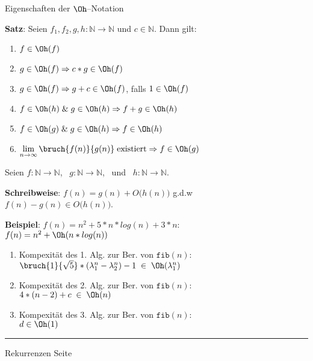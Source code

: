 
\begin{slide}{}
\normalsize

\begin{center}
Eigenschaften der $\Oh$--Notation
\end{center}
\vspace*{0.5cm}

\footnotesize
\textbf{Satz}: Seien $f_1,f_2,g,h: \mathbb{N} \rightarrow \mathbb{N}$ und $c \in \mathbb{N}$. Dann gilt:
\begin{enumerate}
\item $f \in \Oh(f)$
\item $g \in \Oh(f) \Rightarrow c * g \in \Oh(f)$
\item $g \in \Oh(f) \Rightarrow g + c \in \Oh(f)$, falls $1 \in \Oh(f)$
\item $f \in \Oh(h) \;\&\; g \in \Oh(h) \Rightarrow f + g \in \Oh(h)$
\item $f \in \Oh(g) \;\&\; g \in \Oh(h) \Rightarrow f \in \Oh(h)$
\item $\lim\limits_{n \rightarrow \infty} \bruch{f(n)}{g(n)}\; \mbox{existiert}
       \Rightarrow f \in \Oh(g)$
  
\end{enumerate}

Seien $f:\mathbb{N} \rightarrow  \mathbb{N}$, \ $g:\mathbb{N} \rightarrow  \mathbb{N}$, \ und \ $h:\mathbb{N} \rightarrow  \mathbb{N}$.

\textbf{Schreibweise}: $f(n) = g(n) + O\bigg(h(n)\bigg)$ g.d.w \\[0.3cm]
\hspace*{1.3cm} $f(n) - g(n) \in O\bigg(h(n)\bigg)$.

\textbf{Beispiel}: $f(n) = n^2 + 5 * n*log(n) + 3*n$: \\[0.3cm]
\hspace*{1.3cm}   $f(n) = n^2 + \Oh(n*log(n))$ 


\begin{enumerate}
\item Kompexit\"at des 1. Alg. zur Ber. von $\mathtt{fib}(n)$: \\[0.3cm]
      \hspace*{1.3cm} 
      $\bruch{1}{\sqrt{5}} * (\lambda_1^n - \lambda_2^n) - 1 \;\in\;\Oh(\lambda_1^n)$
\item Kompexit\"at des 2. Alg. zur Ber. von $\mathtt{fib}(n)$: \\[0.3cm]
      \hspace*{1.3cm} $4 * (n - 2) + c \;\in\; \Oh(n)$
\item Kompexit\"at des 3. Alg. zur Ber. von $\mathtt{fib}(n)$: \\[0.3cm]
      \hspace*{1.3cm} $d \in \Oh(1)$
\end{enumerate}

\vspace*{\fill}
\tiny \addtocounter{mypage}{1}
\rule{17cm}{1mm}
Rekurrenzen  \hspace*{\fill} Seite 
\end{slide}

